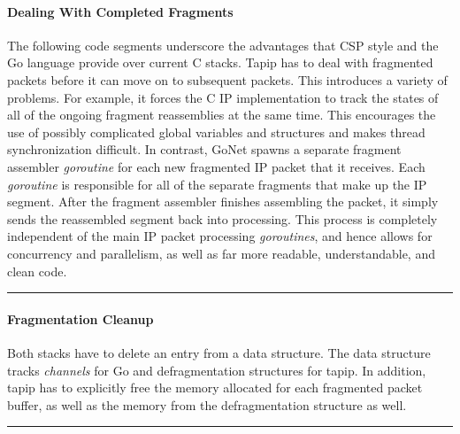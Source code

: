 \documentclass[twocolumn,10pt]{article}
\begin{document}
\paragraph{Dealing With Completed Fragments}
The following code segments underscore the advantages that CSP style and the Go language provide over current C stacks.
Tapip has to deal with fragmented packets before it can move on to subsequent packets. This introduces a variety of problems. For example, it forces the C IP implementation to track the states of all of the ongoing fragment reassemblies at the same time. This encourages the use of possibly complicated global variables and structures and makes thread synchronization difficult. 
In contrast, GoNet spawns a separate fragment assembler \textit{goroutine} for each new fragmented IP packet that it receives. Each \textit{goroutine} is responsible for all of the separate fragments that make up the IP segment. After the fragment assembler finishes assembling the packet, it simply sends the reassembled segment back into processing. This process is completely independent of the main IP packet processing \textit{goroutines}, and hence allows for concurrency and parallelism, as well as far more readable, understandable, and clean code. 

\begin{minipage}{0.47\linewidth}
	
\end{minipage}
\hrule
\begin{minipage}[t]{0.47\linewidth}
	
\end{minipage}
\vspace{-4mm}

\paragraph{Fragmentation Cleanup}
Both stacks have to delete an entry from a data structure. The data structure tracks \textit{channels} for Go and defragmentation structures for tapip. In addition, tapip has to explicitly free the memory allocated for each fragmented packet buffer, as well as the memory from the defragmentation structure as well. 

\begin{minipage}{0.47\linewidth}
	
\end{minipage}
\hrule
\begin{minipage}[t]{0.47\linewidth}
	
\end{minipage}
\vspace{-4mm}
\end{document}
